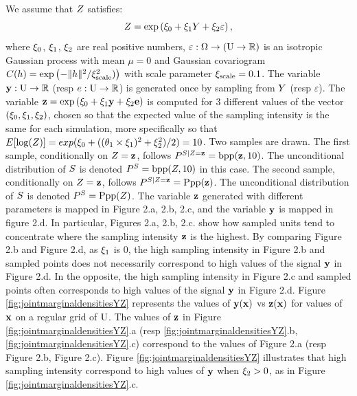 \begin{example}
\label{example:2.2}
We assume that 
$Z$ satisfies:
$$Z=\mathrm{exp}\left(\xi_0+\xi_1Y+\xi_2 \varepsilon\right),$$
where $\xi_0$,  $\xi_1$, $\xi_2$ are real positive numbers, 
$\varepsilon:\Omega\to\left(\mathrm{U}\to\mathbb{R}\right)$
is an isotropic Gaussian process with mean
$\mu=0$ and Gaussian covariogram $C(h)=\exp\left(-\|h\|^2/\xi_{\text{scale}}^2)\right)$ with scale parameter $\xi_{\text{scale}}=0.1$. The variable $\mathbf{y}:\mathrm{U}\to\mathbb{R}$ (resp $e:\mathrm{U}\to\mathbb{R}$) is generated once by sampling from $Y$ (resp $\varepsilon$). The variable $\mathbf{z}=\exp\left(\xi_0+\xi_1\mathbf{y}+\xi_2\mathbf{e}\right)$ is computed for 3 different values of the vector 
$(\xi_0,\xi_1, \xi_2)$, chosen so that the expected value of the sampling intensity is the same for each simulation, more specifically so that $E[\log(Z)]=exp(\xi_0+((\theta_1\times\xi_1)^2+\xi_2^2)/2)=10$. Two samples are drawn. The first sample, conditionally on $Z=\mathbf{z}$, follows $P^{S\mid Z=\mathbf{z}}=\mathrm{bpp}(\mathbf{z},10)$. The unconditional distribution of $S$  is denoted $P^S=\mathrm{bpp}(Z,10)$ in this case. The second sample, conditionally on $Z=\mathbf{z}$, follows $P^{S\mid Z=\mathbf{z}}=\mathrm{Ppp}(\mathbf{z})$. The unconditional distribution of $S$  is denoted  $P^S=\mathrm{Ppp}(Z)$.
The variable $\mathbf{z}$ generated with different parameters is mapped in Figure 2.a, 2.b, 2.c, and the variable $\mathbf{y}$ is mapped in figure 2.d. In particular, Figures 2.a, 2.b, 2.c. show how sampled units tend to concentrate where the sampling intensity $\mathbf{z}$ is the highest.
By comparing Figure 2.b and Figure 2.d, as $\xi_1$ is 0, the high sampling intensity in Figure 2.b and sampled points does not necessarily correspond to high values of the signal $\mathbf{y}$ in Figure 2.d. 
In the opposite, the high sampling intensity in Figure 2.c and sampled points often corresponds to high values of the signal $\mathbf{y}$ in Figure 2.d. Figure \ref{fig:jointmarginaldensitiesYZ} represents the values of $\mathbf{y}(\mathbf{x})$ vs $\mathbf{z}(\mathbf{x})$ for values of $\mathbf{x}$ on a regular grid of $\mathrm{U}$.
The values of $\mathbf{z}$ in Figure \ref{fig:jointmarginaldensitiesYZ}.a (resp 
\ref{fig:jointmarginaldensitiesYZ}.b, 
\ref{fig:jointmarginaldensitiesYZ}.c) correspond to the values of Figure 2.a (resp 
Figure 2.b, 
Figure 2.c). Figure \ref{fig:jointmarginaldensitiesYZ} illustrates that high sampling intensity correspond to high values of $\mathbf{y}$ when $\xi_2>0$, as in Figure  \ref{fig:jointmarginaldensitiesYZ}.c.



\end{example}
